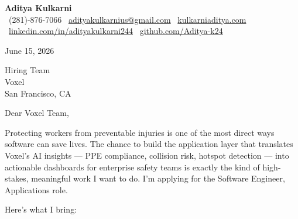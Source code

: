 \documentclass[11pt]{article}
\begin{document}
\begin{center}
  {\LARGE \textbf{Aditya Kulkarni}} \\[4pt]
  \small
  \faPhone\ (281)-876-7066 \quad
  \faEnvelope\ \href{mailto:adityakulkarnius@gmail.com}{adityakulkarnius@gmail.com} \quad
  \faGlobe\ \href{https://www.kulkarniaditya.com}{kulkarniaditya.com} \quad
  \faLinkedin\ \href{https://www.linkedin.com/in/adityakulkarni244/}{linkedin.com/in/adityakulkarni244} \quad
  \faGithub\ \href{https://github.com/Aditya-k24}{github.com/Aditya-k24}
\end{center}

\vspace{6pt}

June 15, 2026

\vspace{6pt}

Hiring Team \\
Voxel \\
San Francisco, CA

\vspace{10pt}

Dear Voxel Team,

\vspace{6pt}

Protecting workers from preventable injuries is one of the most direct ways software can save lives. The chance to build the application layer that translates Voxel's AI insights — PPE compliance, collision risk, hotspot detection — into actionable dashboards for enterprise safety teams is exactly the kind of high-stakes, meaningful work I want to do. I'm applying for the Software Engineer, Applications role.

\vspace{8pt}

Here's what I bring:
\end{document}
